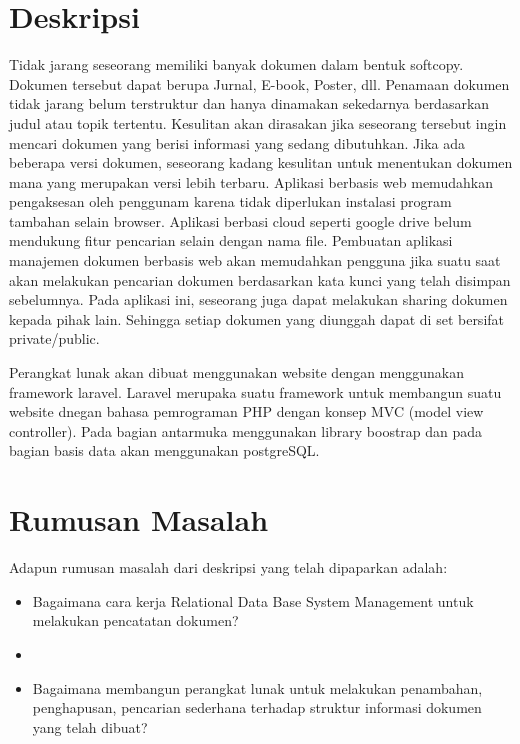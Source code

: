 \documentclass[a4paper,twoside]{article}
\begin{document}
\title{\@judultopik}
\author{\nama \textendash \@npm} 

\newcommand{\nama}{Reynaldi Rahadian}
\newcommand{\@npm}{2016730028}
\newcommand{\@judultopik}{Pembuatan Sistem Manajemen Dokumen Berbasis Web} %
\newcommand{\jumpemb}{1} %
\newcommand{\tanggal}{01/01/1900}


\maketitle


\section{Deskripsi}

Tidak jarang seseorang memiliki banyak dokumen dalam bentuk softcopy. Dokumen tersebut dapat berupa Jurnal, E-book, Poster, dll. Penamaan dokumen tidak jarang belum terstruktur dan hanya dinamakan sekedarnya berdasarkan judul atau topik tertentu. Kesulitan akan dirasakan jika seseorang tersebut ingin mencari dokumen yang berisi informasi yang sedang dibutuhkan. Jika ada beberapa versi dokumen, seseorang kadang kesulitan untuk menentukan dokumen mana yang merupakan versi lebih terbaru. Aplikasi berbasis web memudahkan pengaksesan oleh penggunam karena tidak diperlukan instalasi program tambahan selain browser. Aplikasi berbasi cloud seperti google drive belum mendukung fitur pencarian selain dengan nama file. Pembuatan aplikasi manajemen dokumen berbasis web akan memudahkan pengguna jika suatu saat akan melakukan pencarian dokumen berdasarkan kata kunci yang telah disimpan sebelumnya. Pada aplikasi ini, seseorang juga dapat melakukan sharing dokumen kepada pihak lain. Sehingga setiap dokumen yang diunggah dapat di set bersifat private/public. \

Perangkat lunak akan dibuat menggunakan website dengan menggunakan framework laravel. Laravel merupaka suatu framework untuk membangun suatu website dnegan bahasa pemrograman PHP dengan konsep MVC (model view controller). Pada bagian antarmuka menggunakan library boostrap dan pada bagian basis data akan menggunakan postgreSQL.

\section{Rumusan Masalah}
Adapun rumusan masalah dari deskripsi yang telah dipaparkan adalah:
\begin{itemize}
	\item Bagaimana cara kerja Relational Data Base System Management untuk melakukan pencatatan dokumen?
	\item 
	\item Bagaimana membangun perangkat lunak untuk melakukan penambahan, penghapusan, pencarian sederhana terhadap struktur informasi dokumen yang telah dibuat?
	
\end{itemize}
\end{document}
